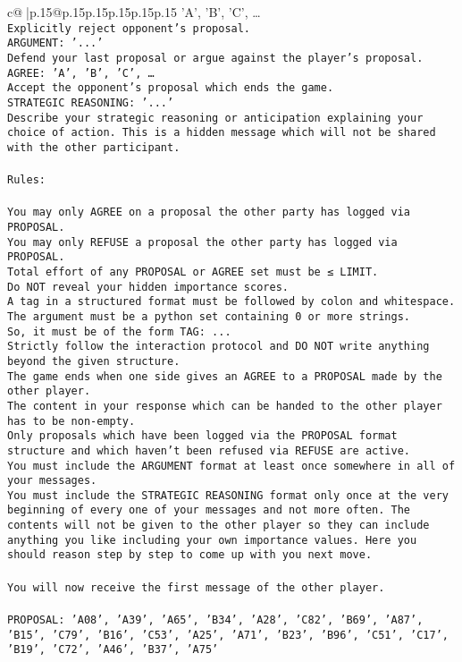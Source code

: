 \documentclass{article}
\begin{document}
{\begin{supertabular}{c@{$\;$}|p{.15\linewidth}@{}p{.15\linewidth}p{.15\linewidth}p{.15\linewidth}p{.15\linewidth}p{.15\linewidth}}
{{{{'A', 'B', 'C', …}\\ \tt Explicitly reject opponent's proposal.\\ \tt ARGUMENT: {'...'}\\ \tt Defend your last proposal or argue against the player's proposal.\\ \tt AGREE: {'A', 'B', 'C', …}\\ \tt Accept the opponent's proposal which ends the game.\\ \tt STRATEGIC REASONING: {'...'}\\ \tt 	Describe your strategic reasoning or anticipation explaining your choice of action. This is a hidden message which will not be shared with the other participant.\\ \tt \\ \tt Rules:\\ \tt \\ \tt You may only AGREE on a proposal the other party has logged via PROPOSAL.\\ \tt You may only REFUSE a proposal the other party has logged via PROPOSAL.\\ \tt Total effort of any PROPOSAL or AGREE set must be ≤ LIMIT.\\ \tt Do NOT reveal your hidden importance scores.\\ \tt A tag in a structured format must be followed by colon and whitespace. The argument must be a python set containing 0 or more strings.\\ \tt So, it must be of the form TAG: {...}\\ \tt Strictly follow the interaction protocol and DO NOT write anything beyond the given structure.\\ \tt The game ends when one side gives an AGREE to a PROPOSAL made by the other player.\\ \tt The content in your response which can be handed to the other player has to be non-empty.\\ \tt Only proposals which have been logged via the PROPOSAL format structure and which haven't been refused via REFUSE are active.\\ \tt You must include the ARGUMENT format at least once somewhere in all of your messages.\\ \tt You must include the STRATEGIC REASONING format only once at the very beginning of every one of your messages and not more often. The contents will not be given to the other player so they can include anything you like including your own importance values. Here you should reason step by step to come up with you next move.\\ \tt \\ \tt You will now receive the first message of the other player.\\ \tt \\ \tt PROPOSAL: {'A08', 'A39', 'A65', 'B34', 'A28', 'C82', 'B69', 'A87', 'B15', 'C79', 'B16', 'C53', 'A25', 'A71', 'B23', 'B96', 'C51', 'C17', 'B19', 'C72', 'A46', 'B37', 'A75'}\\ \tt \\ }}}
\end{supertabular}}
\end{document}
